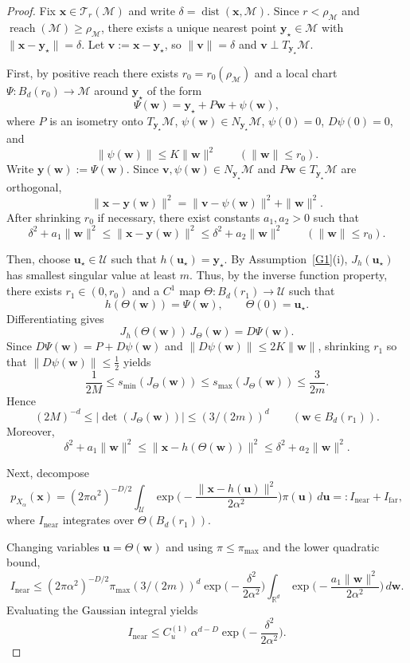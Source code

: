 \documentclass[12pt]{article}
\theoremstyle{definition} %
\newcommand{\R}{\mathbb{R}}
\newcommand{\M}{\mathcal{M}}
\newcommand{\y}{\bm y}
\newcommand{\x}{\bm x}
\newcommand{\dist}{\operatorname{dist}}
\newcommand{\reach}{\operatorname{reach}}
\begin{document}
\begin{proof}
Fix $\x\in\mathcal T_r(\mathcal M)$ and write $\delta=\dist(\x,\mathcal M)$.
Since $r<\rho_{\M}$ and $\reach(\mathcal M)\ge\rho_{\M}$, there exists a unique nearest point
$\y_\star\in\mathcal M$ with $\|\x-\y_\star\|=\delta$. Let $\bm v:=\x-\y_\star$, so
$\|\bm v\|=\delta$ and $\bm v\perp T_{\y_\star}\mathcal M$.

First, by positive reach there exists $r_0=r_0(\rho_{\M})$ and a local chart
$\Psi:B_d(r_0)\to\mathcal M$ around $\y_\star$ of the form
\[
\Psi(\bm w)=\y_\star+P\bm w+\psi(\bm w),
\]
where $P$ is an isometry onto $T_{\y_\star}\mathcal M$,
$\psi(\bm w)\in N_{\y_\star}\mathcal M$,
$\psi(0)=0$, $D\psi(0)=0$, and
\[
\|\psi(\bm w)\|\le K\|\bm w\|^2
\qquad (\|\bm w\|\le r_0).
\]
Write $\y(\bm w):=\Psi(\bm w)$. Since $\bm v,\psi(\bm w)\in N_{\y_\star}\mathcal M$
and $P\bm w\in T_{\y_\star}\mathcal M$ are orthogonal,
\[
\|\x-\y(\bm w)\|^2
=
\|\bm v-\psi(\bm w)\|^2+\|\bm w\|^2.
\]
After shrinking $r_0$ if necessary, there exist constants $a_1,a_2>0$ such that
\[
\delta^2+a_1\|\bm w\|^2
\le
\|\x-\y(\bm w)\|^2
\le
\delta^2+a_2\|\bm w\|^2
\qquad (\|\bm w\|\le r_0).
\]

Then, choose $\bm u_\star\in\mathcal U$ such that
$h(\bm u_\star)=\y_\star$.
By Assumption~\ref{G1}(i), $J_h(\bm u_\star)$ has smallest singular value at least $m$.
Thus, by the inverse function property, 
there exists $r_1\in(0,r_0)$ and a $C^1$ map
$\Theta:B_d(r_1)\to\mathcal U$ such that
\[
h(\Theta(\bm w))=\Psi(\bm w),
\qquad
\Theta(0)=\bm u_\star.
\]
Differentiating gives
\[
J_h(\Theta(\bm w))\,J_\Theta(\bm w)=D\Psi(\bm w).
\]
Since $D\Psi(\bm w)=P+D\psi(\bm w)$ and $\|D\psi(\bm w)\|\le 2K\|\bm w\|$,
shrinking $r_1$ so that $\|D\psi(\bm w)\|\le \tfrac12$ yields
\[
\frac{1}{2M}\le s_{\min}(J_\Theta(\bm w))
\le s_{\max}(J_\Theta(\bm w))
\le \frac{3}{2m}.
\]
Hence
\[
(2M)^{-d}\le |\det(J_\Theta(\bm w))|
\le (3/(2m))^{d}
\qquad (\bm w\in B_d(r_1)).
\]
Moreover,
\[
\delta^2+a_1\|\bm w\|^2
\le
\|\x-h(\Theta(\bm w))\|^2
\le
\delta^2+a_2\|\bm w\|^2.
\]

Next, decompose
\[
p_{X_\alpha}(\x)
=
(2\pi\alpha^2)^{-D/2}
\int_{\mathcal U}
\exp\!\Big(-\frac{\|\x-h(\bm u)\|^2}{2\alpha^2}\Big)
\pi(\bm u)\,d\bm u
=:I_{\mathrm{near}}+I_{\mathrm{far}},
\]
where $I_{\mathrm{near}}$ integrates over $\Theta(B_d(r_1))$.

Changing variables $\bm u=\Theta(\bm w)$ and using
$\pi\le\pi_{\max}$ and the lower quadratic bound,
\[
I_{\mathrm{near}}
\le
(2\pi\alpha^2)^{-D/2}\pi_{\max}(3/(2m))^{d}
\exp\!\Big(-\frac{\delta^2}{2\alpha^2}\Big)
\int_{\R^d}
\exp\!\Big(-\frac{a_1\|\bm w\|^2}{2\alpha^2}\Big)\,d\bm w.
\]
Evaluating the Gaussian integral yields
\[
I_{\mathrm{near}}
\le
C_u^{(1)}\,
\alpha^{d-D}
\exp\!\Big(-\frac{\delta^2}{2\alpha^2}\Big).
\]


\end{proof}
\end{document}
